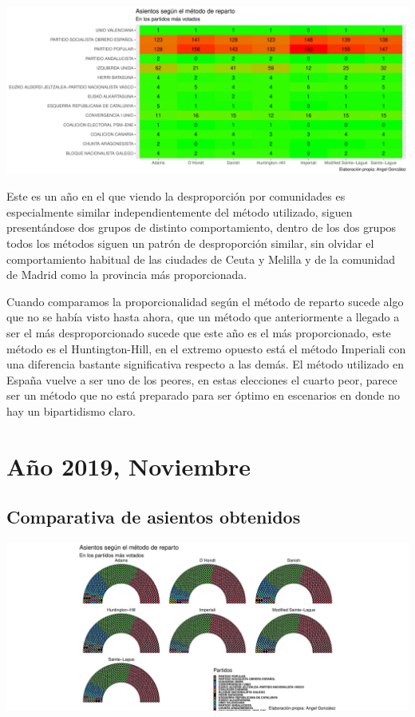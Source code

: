 \documentclass[12pt,a4paper,]{book}
\numberwithin{dummy}{section}
\theoremstyle{ocrenumbox}
\theoremstyle{blacknumex}
\theoremstyle{blacknumbox}
\theoremstyle{ocrenum}
\theoremstyle{ocrenum}
\begin{document}
\begin{center}\includegraphics[width=1\linewidth]{figurasR/unnamed-chunk-113-2} \end{center}

Este es un año en el que viendo la desproporción por comunidades es
especialmente similar independientemente del método utilizado, siguen
presentándose dos grupos de distinto comportamiento, dentro de los dos
grupos todos los métodos siguen un patrón de desproporción similar, sin
olvidar el comportamiento habitual de las ciudades de Ceuta y Melilla y
de la comunidad de Madrid como la provincia más proporcionada.

Cuando comparamos la proporcionalidad según el método de reparto sucede
algo que no se había visto hasta ahora, que un método que anteriormente
a llegado a ser el más desproporcionado sucede que este año es el más
proporcionado, este método es el Huntington-Hill, en el extremo opuesto
está el método Imperiali con una diferencia bastante significativa
respecto a las demás. El método utilizado en España vuelve a ser uno de
los peores, en estas elecciones el cuarto peor, parece ser un método que
no está preparado para ser óptimo en escenarios en donde no hay un
bipartidismo claro.

\hypertarget{auxf1o-2019-noviembre}{%
\section{Año 2019, Noviembre}\label{auxf1o-2019-noviembre}}

\hypertarget{comparativa-de-asientos-obtenidos-14}{%
\subsection{Comparativa de asientos
obtenidos}\label{comparativa-de-asientos-obtenidos-14}}

\begin{center}\includegraphics[width=1\linewidth]{figurasR/unnamed-chunk-115-1} \end{center}
\end{document}
